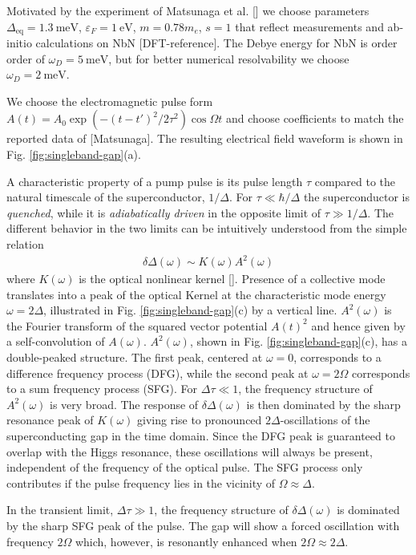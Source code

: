 \documentclass[aps,prb,reprint,noeprint,superscriptaddress]{revtex4-1}
\begin{document}
Motivated by the experiment of Matsunaga et al. [] we choose parameters
$\Delta_{\text{eq}}=\SI{1.3}{\milli\electronvolt}$,
$\varepsilon_{F}=\SI{1}{\electronvolt}$, $m=0.78 m_e$, $s=1$ that reflect
measurements and ab-initio calculations on NbN [DFT-reference].
The Debye energy for NbN is order order of 
$\omega_D = \SI{5}{\milli\electronvolt}$, but
for better numerical resolvability we choose $\omega_D =
\SI{2}{\milli\electronvolt}$.

We choose the electromagnetic pulse form $A(t) = A_0 \exp\left( -(t-t')^2/2\tau^2
\right)\cos \Omega t$ and choose coefficients to match the reported data 
of [Matsunaga]. The resulting
electrical field waveform is shown in Fig. \ref{fig:singleband-gap}(a). 

A characteristic property of a pump pulse is its pulse 
length $\tau$ compared to the natural
timescale of the superconductor, $1/\Delta$. For $\tau \ll \hbar / \Delta$
the superconductor is \textit{quenched}, while it is \textit{adiabatically
driven} in the
opposite limit of $\tau \gg  1 / \Delta$. 
The different behavior in the two limits can be intuitively understood 
from the simple relation
\begin{eqnarray*}
  \delta \Delta(\omega) \sim K(\omega) A^2(\omega)
\end{eqnarray*}
where $K(\omega)$ is the optical nonlinear kernel []. Presence of a collective mode
translates into a peak of the optical Kernel at the characteristic mode energy
$\omega=2\Delta$, illustrated in Fig. \ref{fig:singleband-gap}(c) by a vertical
line.
$A^2(\omega)$  
is the Fourier transform of the squared vector
potential $A(t)^2$ and hence given by a self-convolution of $A(\omega)$. $A^2(\omega)$, shown in Fig. 
\ref{fig:singleband-gap}(c), has a double-peaked structure. The first peak,
centered at $\omega=0$, corresponds to a difference frequency process (DFG),
while the second peak at $\omega=2\Omega$ corresponds to a sum frequency process
(SFG). For $\Delta\tau\ll 1$, the frequency structure of $A^2(\omega)$ is very
broad. The response of $\delta\Delta(\omega)$ is then dominated by the sharp
resonance peak of $K(\omega)$ giving rise to pronounced $2\Delta$-oscillations
of the superconducting gap in the time domain. 
Since the DFG peak is 
guaranteed to overlap with the Higgs resonance,
these oscillations will always be present,
independent of the frequency of the optical pulse. The SFG process only contributes
if the pulse frequency lies in the vicinity of $\Omega \approx \Delta$.

In the transient limit, $\Delta \tau\gg 1$, the frequency structure of
$\delta\Delta(\omega)$ is dominated by the sharp SFG peak of the pulse. The gap
will show a forced oscillation with frequency $2\Omega$ which, however, is
resonantly enhanced when $2\Omega\approx2\Delta$.
\end{document}
